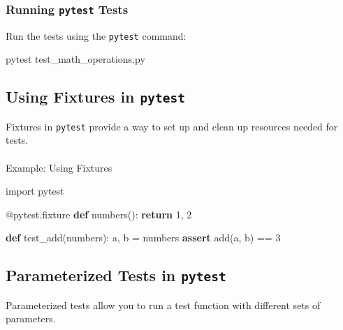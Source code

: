 \documentclass[
  letterpaper,
  DIV=11,
  numbers=noendperiod]{scrreprt}
\makeatletter
\let\oldparagraph\paragraph
\renewcommand{\paragraph}{
    \@ifstar
      \xxxParagraphStar
      \xxxParagraphNoStar
  }
\newcommand{\xxxParagraphStar}[1]{\oldparagraph*{#1}\mbox{}}
\newcommand{\xxxParagraphNoStar}[1]{\oldparagraph{#1}\mbox{}}
\newenvironment{Shaded}{\begin{snugshade}}{\end{snugshade}}
\newcommand{\AttributeTok}[1]{\textcolor[rgb]{0.40,0.45,0.13}{#1}}
\newcommand{\ControlFlowTok}[1]{\textcolor[rgb]{0.00,0.23,0.31}{\textbf{#1}}}
\newcommand{\DecValTok}[1]{\textcolor[rgb]{0.68,0.00,0.00}{#1}}
\newcommand{\ExtensionTok}[1]{\textcolor[rgb]{0.00,0.23,0.31}{#1}}
\newcommand{\ImportTok}[1]{\textcolor[rgb]{0.00,0.46,0.62}{#1}}
\newcommand{\KeywordTok}[1]{\textcolor[rgb]{0.00,0.23,0.31}{\textbf{#1}}}
\newcommand{\NormalTok}[1]{\textcolor[rgb]{0.00,0.23,0.31}{#1}}
\newcommand{\OperatorTok}[1]{\textcolor[rgb]{0.37,0.37,0.37}{#1}}
\makeatother
\begin{document}
\subsubsection{\texorpdfstring{Running \texttt{pytest}
Tests}{Running pytest Tests}}\label{running-pytest-tests}

Run the tests using the \texttt{pytest} command:

\begin{Shaded}
\begin{Highlighting}[]
\ExtensionTok{pytest}\NormalTok{ test\_math\_operations.py}
\end{Highlighting}
\end{Shaded}

\subsection{\texorpdfstring{Using Fixtures in
\texttt{pytest}}{Using Fixtures in pytest}}\label{using-fixtures-in-pytest}

Fixtures in \texttt{pytest} provide a way to set up and clean up
resources needed for tests.

\paragraph{Example: Using Fixtures}\label{example-using-fixtures}

\begin{Shaded}
\begin{Highlighting}[]
\ImportTok{import}\NormalTok{ pytest}

\AttributeTok{@pytest.fixture}
\KeywordTok{def}\NormalTok{ numbers():}
    \ControlFlowTok{return} \DecValTok{1}\NormalTok{, }\DecValTok{2}

\KeywordTok{def}\NormalTok{ test\_add(numbers):}
\NormalTok{    a, b }\OperatorTok{=}\NormalTok{ numbers}
    \ControlFlowTok{assert}\NormalTok{ add(a, b) }\OperatorTok{==} \DecValTok{3}
\end{Highlighting}
\end{Shaded}

\subsection{\texorpdfstring{Parameterized Tests in
\texttt{pytest}}{Parameterized Tests in pytest}}\label{parameterized-tests-in-pytest}

Parameterized tests allow you to run a test function with different sets
of parameters.
\end{document}
